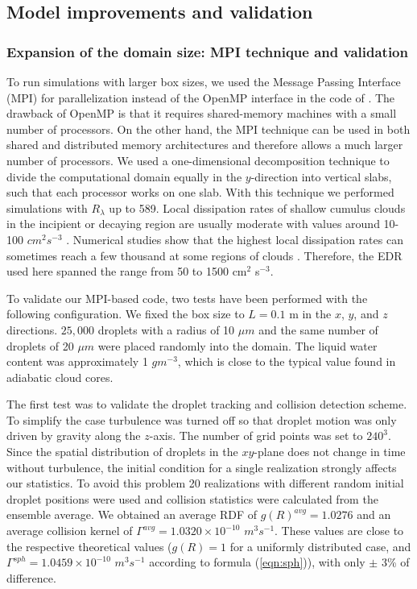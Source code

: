 \subsection{Model improvements and validation} \label{sec:ch2_compares}

\subsubsection{Expansion of the domain size: MPI technique and validation} \label{sec:ch2_mpi}

To run simulations with larger box sizes, we used the Message Passing Interface (MPI) for parallelization instead of the OpenMP interface in the code of \citet{Franklin2005}. The drawback of OpenMP is that it requires shared-memory machines with a small number of processors. On the other hand, the MPI technique can be used in both shared and distributed memory architectures and therefore allows a much larger number of processors. We used a one-dimensional decomposition technique to divide the computational domain equally in the $y$-direction into vertical slabs, such that each processor works on one slab. With this technique we performed simulations with $R_\lambda$ up to 589. Local dissipation rates of shallow cumulus clouds in the incipient or decaying region are usually moderate with values around 10-100 $cm^2s^{-3}$ \citep{Seifert2010}. Numerical studies show that the highest local dissipation rates can sometimes reach a few thousand at some regions of clouds \citep{Franklin2014, Benmoshe2014}. Therefore, the EDR used here spanned the range from 50 to 1500 cm$^2$ s$^{-3}$.

To validate our MPI-based code, two tests have been performed with the following configuration. We fixed the box size to $L=0.1$ m in the $x$, $y$, and $z$ directions. $25,000$ droplets with a radius of 10 $\mu m$ and the same number of droplets of 20 $\mu m$ were placed randomly into the domain. The liquid water content was approximately 1 $gm^{-3}$, which is close to the typical value found in adiabatic cloud cores.

The first test was to validate the droplet tracking and collision detection scheme. To simplify the case turbulence was turned off so that droplet motion was only driven by gravity along the $z$-axis. The number of grid points was set to $240^3$. Since the spatial distribution of droplets in the $xy$-plane does not change in time without turbulence, the initial condition for a single realization strongly affects our statistics. To avoid this problem 20 realizations with different random initial droplet positions were used and collision statistics were calculated from the ensemble average.  We obtained an average RDF of $g(R)^{avg}=1.0276$ and an average collision kernel of $\Gamma^{avg}=1.0320\times 10^{-10}$ $m^3 s^{-1}$. These values are  close to the respective theoretical values ($g(R)=1$ for a uniformly distributed case, and $\Gamma^{sph} = 1.0459\times 10^{-10}$ $m^3 s^{-1}$ according to formula (\ref{eqn:sph})), with only $\pm$ 3\% of difference.

